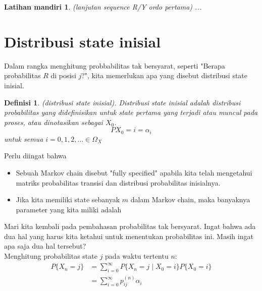 \documentclass[11pt,b5paper,twoside]{book}
\newtheorem{definition}[theorem]{Definisi}
\newtheorem{test}[theorem]{Latihan mandiri}
\begin{document}
	\begin{test} (lanjutan sequence R/Y ordo pertama)
		...
	\end{test}
	
	\section{Distribusi state inisial}
	\noindent Dalam rangka menghitung probbabilitas tak bersyarat, seperti "Berapa probabilitas $R$ di posisi $j$?", kita memerlukan apa yang disebut distribusi state inisial.
	
	\begin{definition}(distribusi state inisial).
		Distribusi state inisial adalah distribusi probabilitas yang didefinisikan untuk state pertama yang terjadi atau muncul pada proses, atau dinotasikan sebagai $X_0$.
		$$
		P{X_0 = i} = \alpha_i
		$$
		untuk semua $i=0,1,2,\dots \in \Omega_X$
	\end{definition}

	\noindent Perlu diingat bahwa
	\begin{itemize}
		\item Sebuah Markov chain disebut "fully specified" apabila kita telah mengetahui matriks probabilitas transisi dan distribusi probabilitas inisialnya.
		
		\item Jika kita memiliki state sebanyak $m$ dalam Markov chain, maka banyaknya parameter yang kita miliki adalah %
	\end{itemize}

	\noindent Mari kita kembali pada pembahasan probabilitas tak bersyarat. Ingat bahwa ada dua hal yang harus kita ketahui untuk menentukan probabilitas ini. Masih ingat apa saja dua hal tersebut?\\
	Menghitung probabilitas state $j$ pada waktu tertentu $n$:
	\begin{equation} \label{tak-bersyarat}
	\begin{aligned}
	P\{X_n=j\} &= \sum_{i=0}^{\infty} P\{X_n = j \mid X_0 = i\} P\{X_0=i\}\\
	& = \sum_{i=0}^{\infty} p_{ij}^{(n)}\alpha_i
	\end{aligned}
	\end{equation}
	
\end{document}
